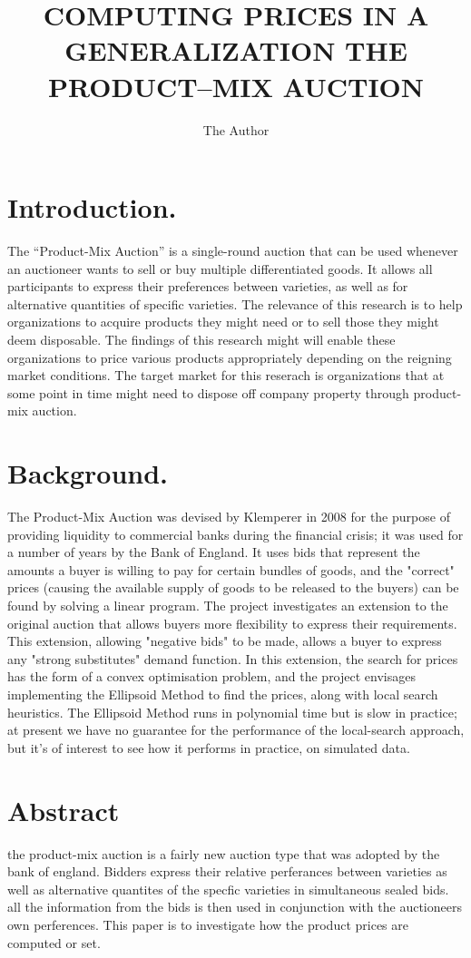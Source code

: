 \documentclass[11pt]{article} %
\title{COMPUTING PRICES IN A GENERALIZATION THE PRODUCT–MIX AUCTION}
\author{The Author}
\begin{document}
\maketitle

\section{Introduction.}

The “Product-Mix Auction” is a single-round auction that can be used whenever an auctioneer wants to sell or buy multiple differentiated goods. It allows all participants to express their preferences between varieties, as well as for alternative quantities of specific varieties.
The relevance of this research is to help organizations to acquire products they might need or to sell those they might deem disposable. The findings of this research might will enable these organizations to price various products appropriately depending on the reigning market conditions. The target market for this reserach is organizations that at some point in time might need to dispose off company property through product-mix auction.

\section{Background.}
The Product-Mix Auction was devised by Klemperer in 2008 for the purpose of providing liquidity to commercial banks during the financial crisis; it was used for a number of years by the Bank of England.
It uses bids that represent the amounts a buyer is willing to pay for certain bundles of goods, and the "correct" prices (causing the available supply of goods to be released to the buyers) can be found by solving a linear program. The project investigates an extension to the original auction that allows buyers more flexibility to express their requirements. This extension, allowing "negative bids" to be made, allows a buyer to express any "strong substitutes" demand function. In this extension, the search for prices has the form of a convex optimisation problem, and the project envisages implementing the Ellipsoid Method to find the prices, along with local search heuristics. The Ellipsoid Method runs in polynomial time but is slow in practice; at present we have no guarantee for the performance of the local-search approach, but it's of interest to see how it performs in practice, on simulated data.

\section{Abstract}
the product-mix auction is a fairly new auction type that was adopted by the bank of england. 
Bidders express their relative perferances between varieties as well as alternative quantites of the specfic varieties in simultaneous sealed bids.
 all the information from the bids is then used in conjunction with the auctioneers own perferences. This paper is to investigate how the product prices are computed or set.
\end{document}
